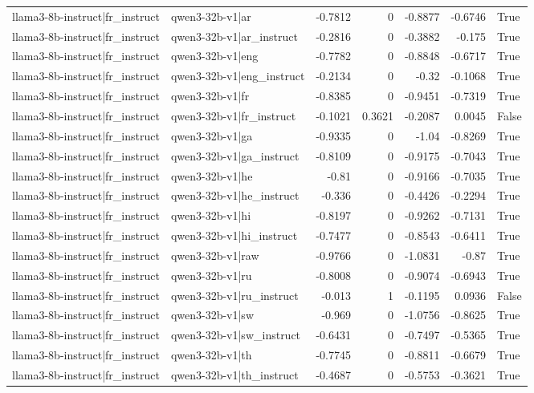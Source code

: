 \begin{table}
\begin{tabular}{l l r r r r l}
llama3-8b-instruct|fr_instruct & qwen3-32b-v1|ar & -0.7812 & 0 & -0.8877 & -0.6746 & True \\
llama3-8b-instruct|fr_instruct & qwen3-32b-v1|ar_instruct & -0.2816 & 0 & -0.3882 & -0.175 & True \\
llama3-8b-instruct|fr_instruct & qwen3-32b-v1|eng & -0.7782 & 0 & -0.8848 & -0.6717 & True \\
llama3-8b-instruct|fr_instruct & qwen3-32b-v1|eng_instruct & -0.2134 & 0 & -0.32 & -0.1068 & True \\
llama3-8b-instruct|fr_instruct & qwen3-32b-v1|fr & -0.8385 & 0 & -0.9451 & -0.7319 & True \\
llama3-8b-instruct|fr_instruct & qwen3-32b-v1|fr_instruct & -0.1021 & 0.3621 & -0.2087 & 0.0045 & False \\
llama3-8b-instruct|fr_instruct & qwen3-32b-v1|ga & -0.9335 & 0 & -1.04 & -0.8269 & True \\
llama3-8b-instruct|fr_instruct & qwen3-32b-v1|ga_instruct & -0.8109 & 0 & -0.9175 & -0.7043 & True \\
llama3-8b-instruct|fr_instruct & qwen3-32b-v1|he & -0.81 & 0 & -0.9166 & -0.7035 & True \\
llama3-8b-instruct|fr_instruct & qwen3-32b-v1|he_instruct & -0.336 & 0 & -0.4426 & -0.2294 & True \\
llama3-8b-instruct|fr_instruct & qwen3-32b-v1|hi & -0.8197 & 0 & -0.9262 & -0.7131 & True \\
llama3-8b-instruct|fr_instruct & qwen3-32b-v1|hi_instruct & -0.7477 & 0 & -0.8543 & -0.6411 & True \\
llama3-8b-instruct|fr_instruct & qwen3-32b-v1|raw & -0.9766 & 0 & -1.0831 & -0.87 & True \\
llama3-8b-instruct|fr_instruct & qwen3-32b-v1|ru & -0.8008 & 0 & -0.9074 & -0.6943 & True \\
llama3-8b-instruct|fr_instruct & qwen3-32b-v1|ru_instruct & -0.013 & 1 & -0.1195 & 0.0936 & False \\
llama3-8b-instruct|fr_instruct & qwen3-32b-v1|sw & -0.969 & 0 & -1.0756 & -0.8625 & True \\
llama3-8b-instruct|fr_instruct & qwen3-32b-v1|sw_instruct & -0.6431 & 0 & -0.7497 & -0.5365 & True \\
llama3-8b-instruct|fr_instruct & qwen3-32b-v1|th & -0.7745 & 0 & -0.8811 & -0.6679 & True \\
llama3-8b-instruct|fr_instruct & qwen3-32b-v1|th_instruct & -0.4687 & 0 & -0.5753 & -0.3621 & True \\

\end{tabular}
\end{table}
